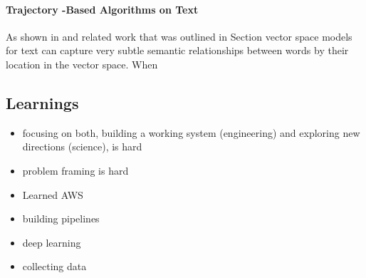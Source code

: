 \paragraph{Trajectory -Based Algorithms on Text}
\label{par:Trajectory Algorithms on Text}
As shown in \cite{Mikolov:2013ac} and related work that was outlined in Section vector space models for text can capture very subtle semantic relationships between words by their location in the vector space. When


\subsection*{Learnings}
\label{sub:learnings}

\begin{itemize}
  \item focusing on both, building a working system (engineering) and exploring new directions (science), is hard
  \item problem framing is hard
  \item Learned AWS
  \item building pipelines
  \item deep learning
  \item collecting data
\end{itemize}
